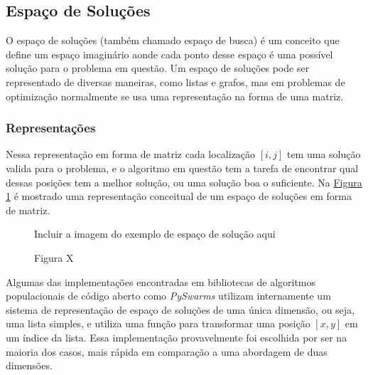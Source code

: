     \subsection{Espaço de Soluções}
            O espaço de soluções (também chamado espaço de busca) é um conceito que define um espaço imaginário aonde cada ponto desse espaço é uma possível solução para o problema em questão. 
            Um espaço de soluções pode ser representado de diversas maneiras, como listas e grafos, mas em problemas de optimização normalmente se usa uma representação na forma de uma matriz.\newline
        

        \subsubsection{Representações}
            Nessa representação em forma de matriz cada localização $[i, j]$ tem uma solução valida para o problema, e o algoritmo em questão tem a tarefa de encontrar qual dessas posições tem a melhor solução, ou uma solução boa o suficiente. Na 
            \hyperref[fig:solution-space]{Figura \ref{fig:solution-space}} 
            é mostrado uma representação conceitual de um espaço de soluções em forma de matriz.\newline
            
            \begin{figure}[h]
                \centering
                \small{Incluir a imagem do exemplo de espaço de solução aqui}
                \caption{Figura X}
                \label{fig:solution-space}
            \end{figure}

            Algumas das implementações encontradas em bibliotecas de algoritmos populacionais de código aberto como \textit{PySwarms} utilizam internamente um sistema de representação de espaço de soluções de uma única dimensão, ou seja, uma lista simples, e utiliza uma função para transformar uma posição $[x,y]$ em um índice da lista. Essa implementação provavelmente foi escolhida por ser na maioria dos casos, mais rápida em comparação a uma abordagem de duas dimensões. \newline


